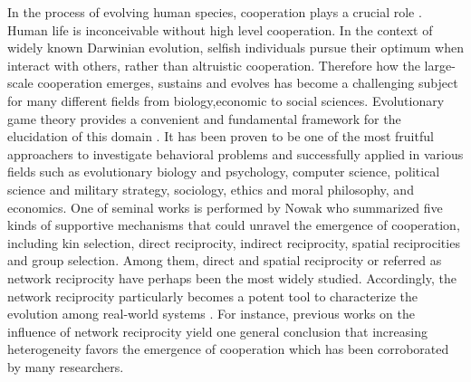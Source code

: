 \documentclass[preprint,12pt,3p]{elsarticle}
\begin{document}
In the process of evolving human species, cooperation plays a 
crucial role \cite{hammerstein2003genetic,hofbauer1998evolutionary}. 
Human life is inconceivable without high level cooperation.
In the context of widely known Darwinian evolution, selfish individuals pursue
their optimum when interact with others, rather than altruistic cooperation.
Therefore how the large-scale cooperation emerges, sustains and evolves has become a
challenging subject for many different fields from biology,economic to social sciences.
    Evolutionary game theory\cite{smith1982evolution,nowakevolutionary} provides a convenient
and fundamental framework for the elucidation of this domain
\cite{Trivers-18254,RapoportChammah-18253,FundenbergMaskin-18255,KendallYao-18256}.
It has been proven to be one of the most fruitful approachers to investigate behavioral problems and successfully applied in various fields such as evolutionary biology and psychology,
computer science, political science and military strategy, sociology,
ethics and moral philosophy, and economics\cite{NowakSigmund-18283,PoncelaGómez-Gardeñes-18278,Tanimoto-18277,
ImhofFudenberg-18279,SantosPacheco-18280,Gracia-LázaroCuesta-18281,AntonioniTomassini-18282,
TanimotoBrede-18276}.
    One of seminal works is performed by Nowak \cite{Nowak-18317}who summarized five kinds of supportive mechanisms
that could unravel the emergence of cooperation, including kin selection, direct reciprocity,
indirect reciprocity, spatial reciprocities and group selection.
Among them, direct and spatial reciprocity or referred as network reciprocity have perhaps been the
most widely studied.
Accordingly, the network reciprocity particularly  becomes a potent tool to characterize the evolution
among real-world systems \cite{boccaletti2006complex}.
For instance, previous works on the influence of network reciprocity yield one general conclusion that increasing heterogeneity favors the emergence of cooperation which has been corroborated
by many researchers\cite{SantosPacheco-18280,NishiShirado-18210,HuangZheng-18221}.
\end{document}
